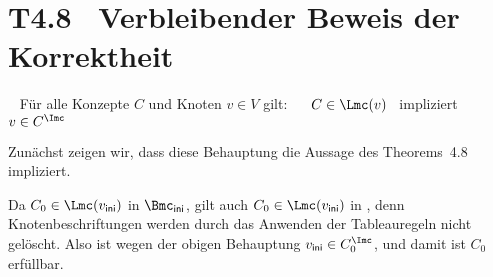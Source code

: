 \documentclass[fontsize=11pt, twoside=false, numbers=autoenddot]{scrbook}
\begin{document}
\newcommand{\TBewKorrTableauxOhne}{T4.8}
\section*{\hypertarget{TBewKorrTableauxOhne}{\TBewKorrTableauxOhne}~ Verbleibender Beweis der Korrektheit}

~
Für alle Konzepte $C$ und Knoten $v \in V$ gilt:
~~
$C \in \Lmc(v)$
~impliziert~
$v \in C^\Imc$

\par\medskip
Zunächst zeigen wir, dass diese Behauptung die Aussage
des Theorems~4.8 impliziert.

Da $C_0 \in \Lmc(v_{\textsf{ini}})$ in $\Bmc_{\textsf{ini}}$,
gilt auch $C_0 \in \Lmc(v_{\textsf{ini}})$ in \Bmc,
denn Knotenbeschriftungen werden durch das Anwenden der Tableauregeln
nicht gelöscht.
Also ist wegen der obigen Behauptung $v_{\textsf{ini}} \in C_0^\Imc$,
und damit ist $C_0$ erfüllbar.
\end{document}
